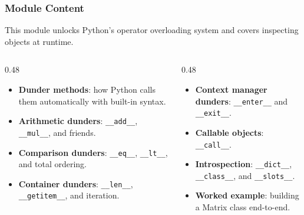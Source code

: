\documentclass[aspectratio=169,10pt]{beamer}
\newcommand{\keyword}[1]{\textcolor{PrimaryBlue}{\textbf{#1}}}
\newcommand{\codeword}[1]{\texttt{#1}}
\begin{document}
\begin{frame}
\frametitle{Module Content}
\small
This module unlocks Python's operator overloading system and covers inspecting objects at runtime.

\vspace{0.16cm}
\begin{columns}[T,totalwidth=0.96\textwidth]
\begin{column}{0.48\textwidth}
\begin{itemize}\setlength\itemsep{0.08cm}
  \item \keyword{Dunder methods}: how Python calls them automatically with built-in syntax.
  \item \keyword{Arithmetic dunders}: \codeword{\_\_add\_\_}, \codeword{\_\_mul\_\_}, and friends.
  \item \keyword{Comparison dunders}: \codeword{\_\_eq\_\_}, \codeword{\_\_lt\_\_}, and total ordering.
  \item \keyword{Container dunders}: \codeword{\_\_len\_\_}, \codeword{\_\_getitem\_\_}, and iteration.
\end{itemize}
\end{column}
\begin{column}{0.48\textwidth}
\begin{itemize}\setlength\itemsep{0.08cm}
  \item \keyword{Context manager dunders}: \codeword{\_\_enter\_\_} and \codeword{\_\_exit\_\_}.
  \item \keyword{Callable objects}: \codeword{\_\_call\_\_}.
  \item \keyword{Introspection}: \codeword{\_\_dict\_\_}, \codeword{\_\_class\_\_}, and \codeword{\_\_slots\_\_}.
  \item \keyword{Worked example}: building a Matrix class end-to-end.
\end{itemize}
\end{column}
\end{columns}
\end{frame}
\end{document}

